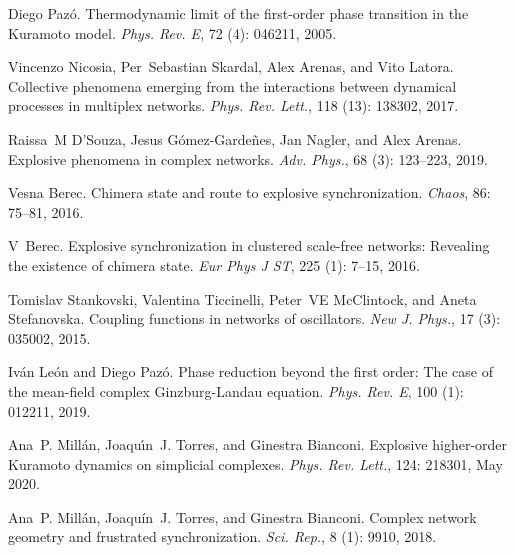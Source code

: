 Diego Paz{\'o}.
\newblock Thermodynamic limit of the first-order phase transition in the
{{Kuramoto}} model.
\newblock \emph{Phys. Rev. E}, 72 (4): 046211, 2005.

Vincenzo Nicosia, Per~Sebastian Skardal, Alex Arenas, and Vito Latora.
\newblock Collective phenomena emerging from the interactions between dynamical
processes in multiplex networks.
\newblock \emph{Phys. Rev. Lett.}, 118 (13): 138302, 2017.

Raissa~M D'Souza, Jesus {G{\'o}mez-Garde{\~n}es}, Jan Nagler, and Alex Arenas.
\newblock Explosive phenomena in complex networks.
\newblock \emph{Adv. Phys.}, 68 (3): 123--223, 2019.

Vesna Berec.
\newblock Chimera state and route to explosive synchronization.
\newblock \emph{Chaos}, 86: 75--81, 2016{}.

V~Berec.
\newblock Explosive synchronization in clustered scale-free networks:
{{Revealing}} the existence of chimera state.
\newblock \emph{Eur Phys J ST}, 225 (1): 7--15,
2016{}.

Tomislav Stankovski, Valentina Ticcinelli, Peter~VE McClintock, and Aneta
Stefanovska.
\newblock Coupling functions in networks of oscillators.
\newblock \emph{New J. Phys.}, 17 (3): 035002, 2015.

Iv{\'a}n Le{\'o}n and Diego Paz{\'o}.
\newblock Phase reduction beyond the first order: The case of the mean-field
complex {{Ginzburg}}-{{Landau}} equation.
\newblock \emph{Phys. Rev. E}, 100 (1): 012211, 2019.

Ana~P. Mill\'an, Joaqu\'{\i}n~J. Torres, and Ginestra Bianconi.
\newblock Explosive higher-order {Kuramoto} dynamics on simplicial complexes.
\newblock \emph{Phys. Rev. Lett.}, 124: 218301, May 2020.

Ana~P. Mill{\'a}n, Joaqu{\'i}n~J. Torres, and Ginestra Bianconi.
\newblock Complex network geometry and frustrated synchronization.
\newblock \emph{Sci. Rep.}, 8 (1): 9910, 2018.

